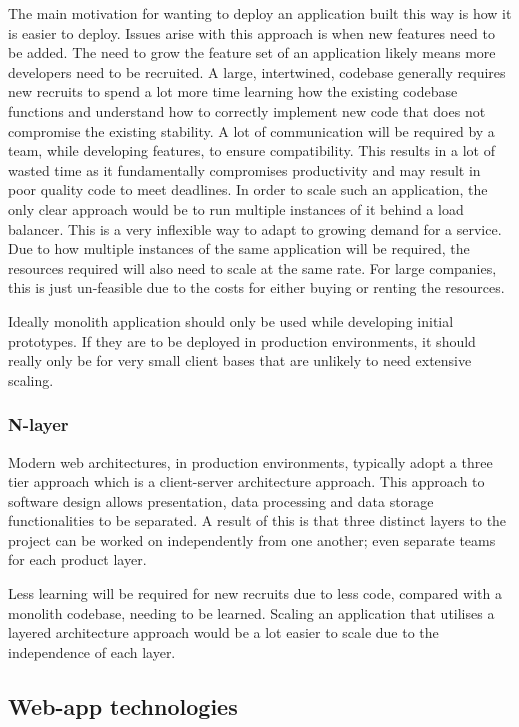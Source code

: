 The main motivation for wanting to deploy an application built this way is how it is easier to deploy\cite{namiot2014micro}.
Issues arise with this approach is when new features need to be added. The need to grow the feature set of an application likely means
more developers need to be recruited. A large, intertwined, codebase generally requires new recruits to spend a lot more time learning
how the existing codebase functions and understand how to correctly implement new code that does not compromise the existing stability.
A lot of communication will be required by a team, while developing features, to ensure compatibility.
This results in a lot of wasted time as it fundamentally compromises productivity and may result in poor quality code to meet deadlines.
In order to scale such an application, the only clear approach would be to run multiple instances of it behind a load balancer.
This is a very inflexible way to adapt to growing demand for a service.
Due to how multiple instances of the same application will be required, the resources required will also need to scale at the same rate.
For large companies, this is just un-feasible due to the costs for either buying or renting the resources. 

Ideally monolith application should only be used while developing initial prototypes. If they are to be deployed in production environments,
it should really only be for very small client bases that are unlikely to need extensive scaling.

\subsubsection{N-layer}

Modern web architectures, in production environments, typically adopt a three tier approach which is a client-server architecture approach.
This approach to software design allows presentation, data processing and data storage functionalities to be separated.
A result of this is that three distinct layers to the project can be worked on independently from one another; even separate teams for
each product layer. 

Less learning will be required for new recruits due to less code, compared with a monolith codebase, needing to be learned.
Scaling an application that utilises a layered architecture approach would be a lot easier to scale due to the independence of each layer.

\subsection{Web-app technologies}

